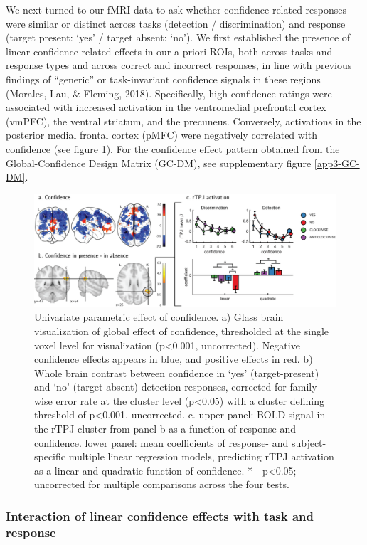 \documentclass[12pt,twoside]{reedthesis}
\begin{document}
We next turned to our fMRI data to ask whether confidence-related responses were similar or distinct across tasks (detection / discrimination) and response (target present: `yes' / target absent: `no'). We first established the presence of linear confidence-related effects in our a priori ROIs, both across tasks and response types and across correct and incorrect responses, in line with previous findings of ``generic'' or task-invariant confidence signals in these regions (Morales, Lau, \& Fleming, 2018). Specifically, high confidence ratings were associated with increased activation in the ventromedial prefrontal cortex (vmPFC), the ventral striatum, and the precuneus. Conversely, activations in the posterior medial frontal cortex (pMFC) were negatively correlated with confidence (see figure \ref{fig:fMRI-exp1-globalConf}). For the confidence effect pattern obtained from the Global-Confidence Design Matrix (GC-DM), see supplementary figure \ref{app3-GC-DM}.
\begin{figure}
\includegraphics[width=\linewidth]{figure/fMRI/figure3} \caption[Univariate parametric effect of confidence]{Univariate parametric effect of confidence. a) Glass brain visualization of global effect of confidence, thresholded at the single voxel level for visualization (p<0.001, uncorrected). Negative confidence effects appears in blue, and positive effects in red. b) Whole brain contrast between confidence in ‘yes’ (target-present) and ‘no’ (target-absent) detection responses, corrected for family-wise error rate at the cluster level (p<0.05) with a cluster defining threshold of p<0.001, uncorrected. c. upper panel: BOLD signal in the rTPJ cluster from panel b as a function of response and confidence. lower panel: mean coefficients of response- and subject-specific multiple linear regression models, predicting rTPJ activation as a linear and quadratic function of confidence.  * - p<0.05; uncorrected for multiple comparisons across the four tests.}\label{fig:fMRI-exp1-globalConf}
\end{figure}
\hypertarget{interaction-of-linear-confidence-effects-with-task-and-response}{%
\subsubsection*{Interaction of linear confidence effects with task and response}\label{interaction-of-linear-confidence-effects-with-task-and-response}}
\end{document}
